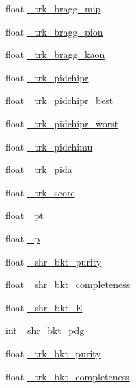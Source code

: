 \begin{DoxyCompactItemize}
float \hyperlink{classselection_1_1CC0piNpSelection_aec1e4d27216773ec40bc66ab5c217abc}{\-\_\-trk\-\_\-bragg\-\_\-mip}
\item 
float \hyperlink{classselection_1_1CC0piNpSelection_a5371981bb5f02024c2ba1d986541ffd9}{\-\_\-trk\-\_\-bragg\-\_\-pion}
\item 
float \hyperlink{classselection_1_1CC0piNpSelection_ac9b23583581239191762cfb60307fb78}{\-\_\-trk\-\_\-bragg\-\_\-kaon}
\item 
float \hyperlink{classselection_1_1CC0piNpSelection_a712eaf6dc6086f1be5705a3bbe5226fc}{\-\_\-trk\-\_\-pidchipr}
\item 
float \hyperlink{classselection_1_1CC0piNpSelection_aaf0a2841494bc52da55d267bc3c8db3d}{\-\_\-trk\-\_\-pidchipr\-\_\-best}
\item 
float \hyperlink{classselection_1_1CC0piNpSelection_a6c06ff43f89cbee19cf466b830a6fe38}{\-\_\-trk\-\_\-pidchipr\-\_\-worst}
\item 
float \hyperlink{classselection_1_1CC0piNpSelection_a74ddf5622f3ee32110e9342361020a89}{\-\_\-trk\-\_\-pidchimu}
\item 
float \hyperlink{classselection_1_1CC0piNpSelection_af0fe49227e33b3f46015a821de58ba1f}{\-\_\-trk\-\_\-pida}
\item 
float \hyperlink{classselection_1_1CC0piNpSelection_a72517a224dc19f95faef3efde9a999d1}{\-\_\-trk\-\_\-score}
\item 
float \hyperlink{classselection_1_1CC0piNpSelection_a98281b58b33ff8c03fa9b00f3f3baa06}{\-\_\-pt}
\item 
float \hyperlink{classselection_1_1CC0piNpSelection_afae64b232d6b3526032b289c91b092cb}{\-\_\-p}
\item 
float \hyperlink{classselection_1_1CC0piNpSelection_a1da68886d5b7a5b4eb1785649c48e8ef}{\-\_\-shr\-\_\-bkt\-\_\-purity}
\item 
float \hyperlink{classselection_1_1CC0piNpSelection_ac3c3c9895ca501c3b73f14addfddf495}{\-\_\-shr\-\_\-bkt\-\_\-completeness}
\item 
float \hyperlink{classselection_1_1CC0piNpSelection_aa1a21f48d99a4de5f1d444aa3d64dedf}{\-\_\-shr\-\_\-bkt\-\_\-\-E}
\item 
int \hyperlink{classselection_1_1CC0piNpSelection_aab09f93d7cd57031de714956414f3230}{\-\_\-shr\-\_\-bkt\-\_\-pdg}
\item 
float \hyperlink{classselection_1_1CC0piNpSelection_a39a84b873306f200a2350b4804429791}{\-\_\-trk\-\_\-bkt\-\_\-purity}
\item 
float \hyperlink{classselection_1_1CC0piNpSelection_aab22ce289e2d4a109440369e30fddf52}{\-\_\-trk\-\_\-bkt\-\_\-completeness}

\end{DoxyCompactItemize}
